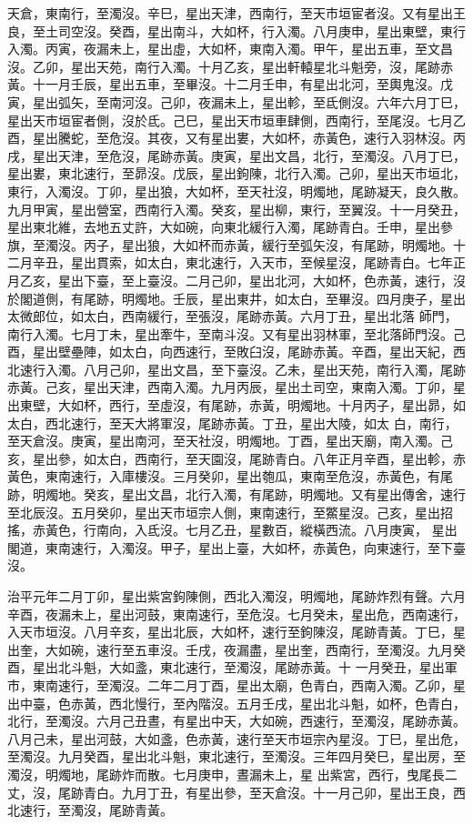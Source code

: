 \begin{pinyinscope}
 天倉，東南行，至濁沒。辛巳，星出天津，西南行，至天市垣宦者沒。又有星出王良，至土司空沒。癸酉，星出南斗，大如杯，行入濁。八月庚申，星出東壁，東行入濁。丙寅，夜漏未上，星出虛，大如杯，東南入濁。甲午，星出五車，至文昌沒。乙卯，星出天苑，南行入濁。十月乙亥，星出軒轅星北斗魁旁，沒，尾跡赤黃。十一月壬辰，星出五車，至畢沒。十二月壬申，有星出北河，至輿鬼沒。戊寅，星出弧矢，至南河沒。己卯，夜漏未上，星出軫，至氐側沒。六年六月丁巳，
 星出天市垣宦者側，沒於氐。己巳，星出天市垣車肆側，西南行，至尾沒。七月乙酉，星出騰蛇，至危沒。其夜，又有星出婁，大如杯，赤黃色，速行入羽林沒。丙戌，星出天津，至危沒，尾跡赤黃。庚寅，星出文昌，北行，至濁沒。八月丁巳，星出婁，東北速行，至昴沒。戊辰，星出鉤陳，北行入濁。己卯，星出天市垣北，東行，入濁沒。丁卯，星出狼，大如杯，至天社沒，明燭地，尾跡凝天，良久散。九月甲寅，星出營室，西南行入濁。癸亥，星出柳，東行，至翼沒。十一月癸丑，
 星出東北維，去地五丈許，大如碗，向東北緩行入濁，尾跡青白。壬申，星出參旗，至濁沒。丙子，星出狼，大如杯而赤黃，緩行至弧矢沒，有尾跡，明燭地。十二月辛丑，星出貫索，如太白，東北速行，入天市，至候星沒，尾跡青白。七年正月乙亥，星出下臺，至上臺沒。二月己卯，星出北河，大如杯，色赤黃，速行，沒於閣道側，有尾跡，明燭地。壬辰，星出東井，如太白，至畢沒。四月庚子，星出太微郎位，如太白，西南緩行，至張沒，尾跡赤黃。六月丁丑，星出北落
 師門，南行入濁。七月丁未，星出牽牛，至南斗沒。又有星出羽林軍，至北落師門沒。己酉，星出壁壘陣，如太白，向西速行，至敗臼沒，尾跡赤黃。辛酉，星出天紀，西北速行入濁。八月己卯，星出文昌，至下臺沒。乙未，星出天苑，南行入濁，尾跡赤黃。己亥，星出天津，西南入濁。九月丙辰，星出土司空，東南入濁。丁卯，星出東壁，大如杯，西行，至虛沒，有尾跡，赤黃，明燭地。十月丙子，星出昴，如太白，西北速行，至天大將軍沒，尾跡赤黃。丁丑，星出大陵，如太
 白，南行，至天倉沒。庚寅，星出南河，至天社沒，明燭地。丁酉，星出天廟，南入濁。己亥，星出參，如太白，西南行，至天園沒，尾跡青白。八年正月辛酉，星出軫，赤黃色，東南速行，入庫樓沒。三月癸卯，星出匏瓜，東南至危沒，赤黃色，有尾跡，明燭地。癸亥，星出文昌，北行入濁，有尾跡，明燭地。又有星出傳舍，速行至北辰沒。五月癸卯，星出天市垣宗人側，東南速行，至鱉星沒。己亥，星出招搖，赤黃色，行南向，入氐沒。七月乙丑，星數百，縱橫西流。八月庚寅，
 星出閣道，東南速行，入濁沒。甲子，星出上臺，大如杯，赤黃色，向東速行，至下臺沒。



 治平元年二月丁卯，星出紫宮鉤陳側，西北入濁沒，明燭地，尾跡炸烈有聲。六月辛酉，夜漏未上，星出河鼓，東南速行，至危沒。七月癸未，星出危，西南速行，入天市垣沒。八月辛亥，星出北辰，大如杯，速行至鉤陳沒，尾跡青黃。丁巳，星出奎，大如碗，速行至五車沒。壬戌，夜漏盡，星出奎，西南行，至濁沒。九月癸酉，星出北斗魁，大如盞，東北速行，至濁沒，尾跡赤黃。十
 一月癸丑，星出軍市，東南速行，至濁沒。二年二月丁酉，星出太廟，色青白，西南入濁。乙卯，星出中臺，色赤黃，西北慢行，至內階沒。五月壬戌，星出北斗魁，如杯，色青白，北行，至濁沒。六月己丑晝，有星出中天，大如碗，西速行，至濁沒，尾跡赤黃。八月己未，星出河鼓，大如盞，色赤黃，速行至天市垣宗內星沒。丁巳，星出危，至濁沒。九月癸酉，星出北斗魁，東北速行，至濁沒。三年四月癸巳，星出房，至濁沒，明燭地，尾跡炸而散。七月庚申，晝漏未上，星
 出紫宮，西行，曳尾長二丈，沒，尾跡青白。九月丁丑，有星出參，至天倉沒。十一月己卯，星出王良，西北速行，至濁沒，尾跡青黃。



\end{pinyinscope}